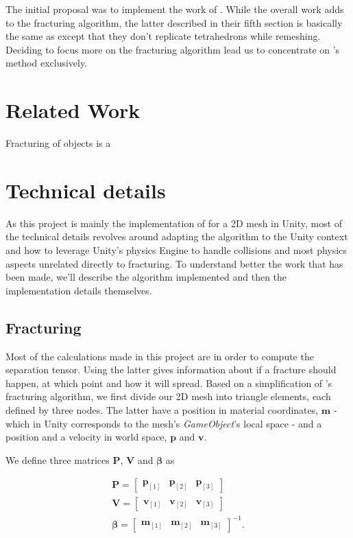 \documentclass[tog]{acmsiggraph}
\begin{document}
The initial proposal was to implement the work of \cite{Parker:2009:RTD}. While the overall work adds to the fracturing algorithm, the latter described in their fifth section is basically the same as \cite{Obrien:1999:GMA} except that they don't replicate tetrahedrons while remeshing. Deciding to focus more on the fracturing algorithm lead us to concentrate on \cite{Obrien:1999:GMA}'s method exclusively. 

\section{Related Work}
Fracturing of objects is a 

\section{Technical details}
As this project is mainly the implementation of \cite{Obrien:1999:GMA} for a 2D mesh in Unity, most of the technical details revolves around adapting the algorithm to the Unity context and how to leverage Unity's physics Engine to handle collisions and most physics aspects unrelated directly to fracturing. To understand better the work that has been made, we'll describe the algorithm  implemented and then the implementation details themselves. 

\subsection{Fracturing}
\label{sec:Fracturing}
Most of the calculations made in this project are in order to compute the separation tensor. Using the latter gives information about if a fracture should happen, at which point and how it will spread. Based on a simplification of \cite{Obrien:1999:GMA}'s fracturing algorithm, we first divide our 2D mesh into triangle elements, each defined by three nodes. The latter have a position in material coordinates, $\pmb{m}$ - which in Unity corresponds to the mesh's \textit{GameObject}'s local space - and a position and a velocity in world space, $\pmb{p}$ and $\pmb{v}$. 

We define three matrices $\mathbf{P}$, $\pmb{V}$ and $\pmb{\beta}$ as

\begin{gather}
\pmb{P} = [
\begin{matrix}
\pmb{p}_{[1]} & \pmb{p}_{[2]} & \pmb{p}_{[3]}
\end{matrix}]\\
\pmb{V} = [
\begin{matrix}
\pmb{v}_{[1]} & \pmb{v}_{[2]} & \pmb{v}_{[3]}
\end{matrix}]\\
\pmb{\beta} = [
\begin{matrix}
\pmb{m}_{[1]} & \pmb{m}_{[2]} & \pmb{m}_{[3]}
\end{matrix}]^{-1} .
\end{gather}
\end{document}
